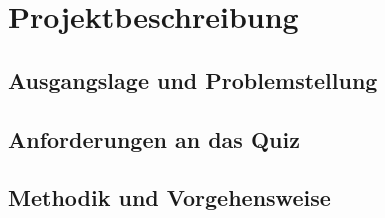 \chapter{Projektbeschreibung}
\section{Ausgangslage und Problemstellung}
\section{Anforderungen an das Quiz}
\section{Methodik und Vorgehensweise}
